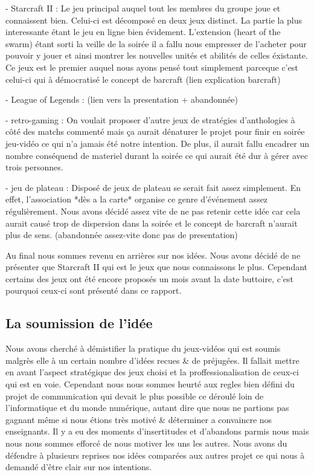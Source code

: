 - Starcraft II : Le jeu principal auquel tout les membres du groupe
joue et connaissent bien. Celui-ci est décomposé en deux jeux distinct.
La partie la plus interessante étant le jeu en ligne bien évidement.
L'extension (heart of the swarm) étant sorti la veille de la soirée il a
fallu nous empresser de l'acheter pour pouvoir y jouer et ainsi montrer
les nouvelles unités et abilités de celles éxistante. Ce jeux est le
premier auquel nous ayons pensé tout simplement parceque c'est celui-ci
qui à démocratisé le concept de barcraft (lien explication barcraft)

- League of Legends : (lien vers la presentation + abandonnée)

- retro-gaming : On voulait proposer d'autre jeux de stratégies
d'anthologies à côté des matchs commenté mais ça aurait dénaturer le
projet pour finir en soirée jeu-vidéo ce qui n'a jamais été notre
intention. De plus, il aurait fallu encadrer un nombre conséquend de
materiel durant la soirée ce qui aurait été dur à gérer avec trois
personnes.

- jeu de plateau : Disposé de jeux de plateau se serait fait assez
simplement. En effet, l'association *dès a la carte* organise ce genre
d'événement assez régulièrement. Nous avons décidé assez vite de ne pas
retenir cette idée car cela aurait causé trop de dispersion dans la
soirée et le concept de barcraft n'aurait plus de sens.  (abandonnée
assez-vite donc pas de presentation)

Au final nous sommes revenu en arrières sur nos idées. Nous avons
décidé de ne présenter que Starcraft II qui est le jeux que nous
connaissons le plus. Cependant certains des jeux ont été encore
proposés un mois avant la date buttoire, c'est pourquoi ceux-ci sont
présenté dans ce rapport.


\subsection{La soumission de l'idée}%
\label{sub:la_soumission_de_leidee}

Nous avons cherché à démistifier la pratique du jeux-vidéos qui est
soumis malgrès elle à un certain nombre d'idées recues & de
préjugées. Il fallait mettre en avant l'aspect stratégique des jeux
choisi et la proffessionalisation de ceux-ci qui est en
voie. Cependant nous nous sommes heurté aux regles bien défini du
projet de communication qui devait le plus possible ce déroulé loin
de l'informatique et du monde numérique, autant dire que nous ne
partions pas gagnant même si nous étions très motivé & déterminer a
convaincre nos enseignants. Il y a eu des moments d'insertitudes et
d'abandons parmis nous mais nous nous sommes efforcé de nous motiver
les uns les autres. Nous avons du défendre à plusieurs reprises nos
idées comparées aux autres projet ce qui nous à demandé d'être clair sur
nos intentions.


